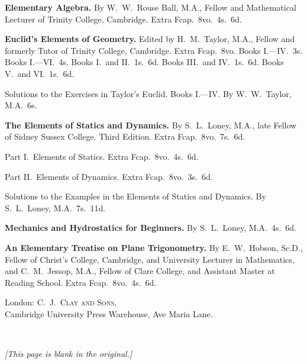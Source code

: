 \documentclass[11pt,a4paper]{article}
\theoremstyle{plain}
\theoremstyle{definition}
\theoremstyle{remark}
\begin{document}
\smallskip

\noindent\textbf{Elementary Algebra.} By W.\ W.\ Rouse Ball, M.A., Fellow and Mathematical Lecturer of Trinity College, Cambridge. Extra Fcap.\ 8vo.\ 4s.\ 6d.

\smallskip

\noindent\textbf{Euclid's Elements of Geometry.} Edited by H.\ M.\ Taylor, M.A., Fellow and formerly Tutor of Trinity College, Cambridge. Extra Fcap.\ 8vo. Books I.---IV.\ 3s. Books I.---VI.\ 4s. Books I.\ and II.\ 1s.\ 6d. Books III.\ and IV.\ 1s.\ 6d. Books V.\ and VI.\ 1s.\ 6d.

\smallskip

Solutions to the Exercises in Taylor's Euclid. Books I.---IV. By W.\ W.\ Taylor, M.A.\ 6s.

\smallskip

\noindent\textbf{The Elements of Statics and Dynamics.} By S.\ L.\ Loney, M.A., late Fellow of Sidney Sussex College. Third Edition. Extra Fcap.\ 8vo.\ 7s.\ 6d.

Part I.\ Elements of Statics. Extra Fcap.\ 8vo.\ 4s.\ 6d.

Part II.\ Elements of Dynamics. Extra Fcap.\ 8vo.\ 3s.\ 6d.

\smallskip

Solutions to the Examples in the Elements of Statics and Dynamics. By S.\ L.\ Loney, M.A.\ 7s.\ 11d.

\smallskip

\noindent\textbf{Mechanics and Hydrostatics for Beginners.} By S.\ L.\ Loney, M.A.\ 4s.\ 6d.

\smallskip

\noindent\textbf{An Elementary Treatise on Plane Trigonometry.} By E.\ W.\ Hobson, Sc.D., Fellow of Christ's College, Cambridge, and University Lecturer in Mathematics, and C.\ M.\ Jessop, M.A., Fellow of Clare College, and Assistant Master at Reading School. Extra Fcap.\ 8vo.\ 4s.\ 6d.

\begin{flushright}
London: C.\ J.\ \textsc{Clay and Sons},\\
Cambridge University Press Warehouse, Ave Maria Lane.
\end{flushright}

\newpage
\setcounter{page}{633}

\thispagestyle{empty}
\ 
\vfill
\begin{center}
\textit{[This page is blank in the original.]}
\end{center}
\vfill
\end{document}
